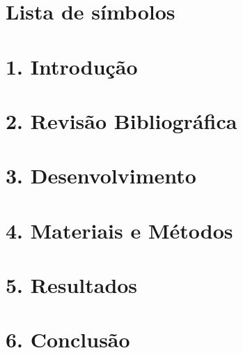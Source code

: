 \documentclass[12pt, a4paper]{report}
\begin{document}
\capa

\folhaderosto
\fichacatalografica
\folhadeaprovacao

\dedicatoria{}
\agradecimentos{}
\epigrafe{}
\resumo{}
\resumolinguaestrangeira{}
\listadefiguras
\listadetabelas
\listadeabreviaturasesiglas

\chapter*{Lista de símbolos}




\sumario

\onehalfspacing		%

\pagestyle{myheadings}


\setcounter{page}{16}
\chapter[Introdução]{1. Introdução}


\chapter[RevisãoBibliográfica]{2. Revisão Bibliográfica}


\chapter[Desenvolvimento]{3. Desenvolvimento}


\chapter[Materiais e Métodos]{4. Materiais e Métodos}


\chapter[Resultados]{5. Resultados}


\chapter[Conclusão]{6. Conclusão}

\end{document}
